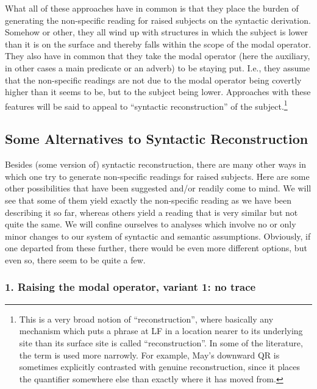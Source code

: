 What all of these approaches have in common is that they place the burden of
generating the non-specific reading for raised subjects on the syntactic
derivation. Somehow or other, they all wind up with structures in which the
subject is lower than it is on the surface and thereby falls within the scope of
the modal operator. They also have in common that they take the modal operator
(here the auxiliary, in other cases a main predicate or an adverb) to be staying
put. I.e., they assume that the non-specific readings are not due to the modal
operator being covertly higher than it seems to be, but to the subject being
lower. Approaches with these features will be said to appeal to ``syntactic
reconstruction'' of the subject.\footnote{This is a very broad notion of
  ``reconstruction'', where basically any mechanism which puts a phrase at LF in
  a location nearer to its underlying site than its surface site is called
  ``reconstruction''. In some of the literature, the term is used more narrowly.
  For example, May's downward QR is sometimes explicitly contrasted with genuine
  reconstruction, since it places the quantifier somewhere else than exactly
  where it has moved from. }

\subsection{Some Alternatives to Syntactic Reconstruction}\label{sem}

Besides (some version of) syntactic reconstruction, there are many other ways in
which one try to generate non-specific readings for raised subjects. Here are
some other possibilities that have been suggested and/or readily come to mind.
We will see that some of them yield exactly the non-specific reading as we have
been describing it so far, whereas others yield a reading that is very similar
but not quite the same. We will confine ourselves to analyses which involve no
or only minor changes to our system of syntactic and semantic assumptions.
Obviously, if one departed from these further, there would be even more different
options, but even so, there seem to be quite a few.

\subsubsection{1. Raising the modal operator, variant 1: no trace}

